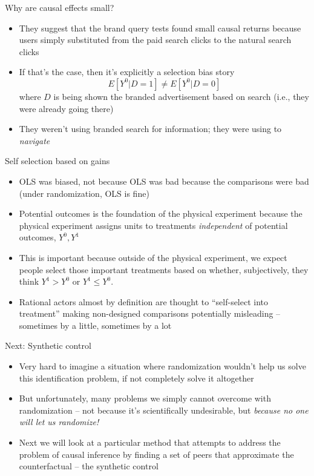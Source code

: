 \documentclass{beamer}
\begin{document}
\begin{frame}{Why are causal effects small?}

\begin{itemize}
\item They suggest that the brand query tests found small causal returns because users simply substituted from the paid search clicks to the natural search clicks
\item If that's the case, then it's explicitly a selection bias story $$E[Y^0|D=1] \neq E[Y^0|D=0]$$ where $D$ is being shown the branded advertisement based on search (i.e., they were already going there)
\item They weren't using branded search for information; they were using to \emph{navigate}
\end{itemize}

\end{frame}

\begin{frame}{Self selection based on gains}

\begin{itemize}
\item OLS was biased, not because OLS was bad because the comparisons were bad (under randomization, OLS is fine)
\item Potential outcomes is the foundation of the physical experiment because the physical experiment assigns units to treatments \emph{independent} of potential outcomes, $Y^0,Y^1$
\item This is important because outside of the physical experiment, we expect people select those important treatments based on whether, subjectively, they think $Y^1>Y^0$ or $Y^1\leq Y^0$. 
\item Rational actors almost by definition are thought to ``self-select into treatment'' making non-designed comparisons potentially misleading -- sometimes by a little, sometimes by a lot
\end{itemize}

\end{frame}


\begin{frame}{Next: Synthetic control}

\begin{itemize}

\item Very hard to imagine a situation where randomization wouldn't help us solve this identification problem, if not completely solve it altogether
\item But unfortunately, many problems we simply cannot overcome with randomization -- not because it's scientifically undesirable, but \emph{because no one will let us randomize!}
\item Next we will look at a particular method that attempts to address the problem of causal inference by finding a set of peers that approximate the counterfactual -- the synthetic control
\end{itemize}

\end{frame}
\end{document}
